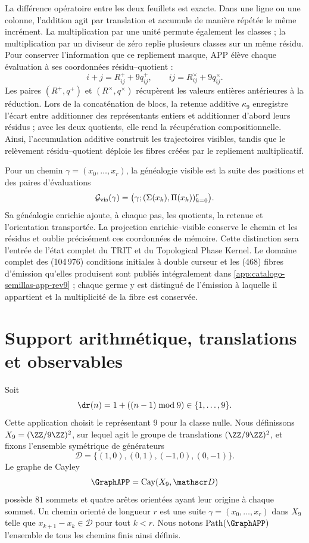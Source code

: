 La différence opératoire entre les deux feuillets est exacte. Dans une ligne ou une colonne,
l'addition agit par translation et accumule de manière répétée le même incrément.
La multiplication par une unité permute également les classes ; la
multiplication par un diviseur de zéro replie plusieurs classes sur un même
résidu. Pour conserver l'information que ce repliement masque, APP élève
chaque évaluation à ses coordonnées résidu--quotient :
\[
 i+j=R^+_{ij}+9q^+_{ij},
 \qquad
 ij=R^\times_{ij}+9q^\times_{ij}.
\]
Les paires \((R^+,q^+)\) et \((R^\times,q^\times)\) récupèrent les valeurs
entières antérieures à la réduction. Lors de la concaténation de blocs, la retenue additive
\(\kappa_9\) enregistre l'écart entre additionner des représentants entiers et
additionner d'abord leurs résidus ; avec les deux quotients, elle rend la
récupération compositionnelle. Ainsi, l'accumulation additive construit les trajectoires visibles,
tandis que le relèvement résidu--quotient déploie les fibres créées par le
repliement multiplicatif.

Pour un chemin \(\gamma=(x_0,\ldots,x_r)\), la généalogie visible est la
suite des positions et des paires d'évaluations
\[
 \mathcal G_{\rm vis}(\gamma)
 =\bigl(\gamma;(\Sigma(x_k),\Pi(x_k))_{k=0}^{r}\bigr).
\]
Sa généalogie enrichie ajoute, à chaque pas, les quotients, la retenue et
l'orientation transportée. La projection enrichie--visible conserve le
chemin et les résidus et oublie précisément ces coordonnées de mémoire. Cette
distinction sera l'entrée de l'état complet du TRIT et du Topological Phase Kernel.
Le domaine complet des (104\,976) conditions initiales à double curseur et
les (468) fibres d'émission qu'elles produisent sont publiés intégralement dans
\cref{app:catalogo-semillas-app-rev9} ; chaque germe y est distingué de
l'émission à laquelle il appartient et la multiplicité de la fibre est conservée.

\section{Support arithmétique, translations et observables}

Soit
\[
\dr(n)=1+((n-1)\bmod9)\in\{1,\ldots,9\}.
\]
Cette application choisit le représentant \(9\) pour la classe nulle. Nous définissons
\(X_9=(\ZZ/9\ZZ)^2\), sur lequel agit le groupe de translations
\((\ZZ/9\ZZ)^2\), et fixons l'ensemble symétrique de générateurs
\[
 \mathscr D=\{(1,0),(0,1),(-1,0),(0,-1)\}.
\]
Le graphe de Cayley
\[
 \GraphAPP=\operatorname{Cay}(X_9,\mathscr D)
\]
possède \(81\) sommets et quatre arêtes orientées ayant leur origine à chaque sommet.
Un chemin orienté de longueur \(r\) est une suite
\(\gamma=(x_0,\ldots,x_r)\) dans \(X_9\) telle que
\(x_{k+1}-x_k\in\mathscr D\) pour tout \(k<r\). Nous notons
\(\operatorname{Path}(\GraphAPP)\) l'ensemble de tous les chemins finis
ainsi définis.

